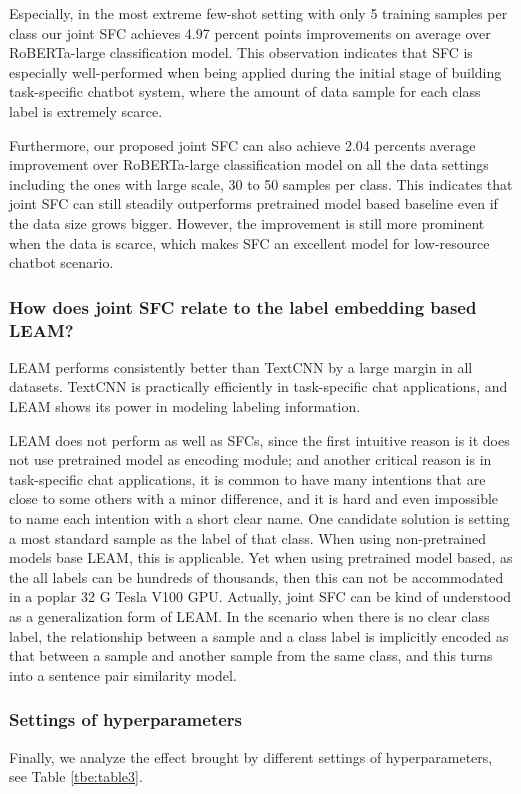 Especially,  in the most extreme few-shot setting with only 5 training samples
per  class  our joint SFC achieves 4.97 percent points improvements on average
over  RoBERTa-large classification model. This observation indicates that SFC
is  especially  well-performed  when being applied during the initial stage of
building  task-specific  chatbot  system,  where the amount of data sample for
each class label is extremely scarce.

Furthermore,  our  proposed  joint  SFC can also achieve 2.04 percents average
improvement  over  RoBERTa-large classification model on all the data settings
including  the  ones  with  large  scale,  30  to  50  samples per class. This
indicates that joint SFC can still steadily outperforms pretrained model based
baseline even if the data size grows bigger. However, the improvement is still
more prominent when the data is scarce, which makes SFC an excellent model for
low-resource chatbot scenario.

\subsubsection*{How does joint SFC relate to the label  embedding based  LEAM?}
LEAM performs consistently better than TextCNN by a large margin in all
datasets. TextCNN is practically efficiently in task-specific chat
applications, and LEAM shows its power in modeling labeling information.

LEAM  does not perform as well as SFCs, since the first intuitive reason is it
does  not use pretrained model as encoding module; and another critical reason
is  in  task-specific  chat applications, it is common to have many intentions
that are close to some others with a minor difference, and it is hard and even
impossible  to  name  each  intention  with  a short clear name. One candidate
solution  is  setting  a most standard sample as the label of that class. When
using  non-pretrained  models  base  LEAM,  this is applicable. Yet when using
pretrained  model  based, as the all labels can be hundreds of thousands, then
this  can not be accommodated in a poplar 32 G Tesla V100 GPU. Actually, joint
SFC  can  be  kind  of  understood  as  a  generalization form of LEAM. In the
scenario when there is no clear class label, the relationship between a sample
and  a class label is implicitly encoded as that between a sample and another
sample  from  the  same  class, and this turns into a sentence pair similarity
model.

\subsubsection*{Settings  of  hyperparameters} 
Finally, we analyze the effect brought
by  different  settings  of  hyperparameters,  see  Table \ref{tbe:table3}. 

